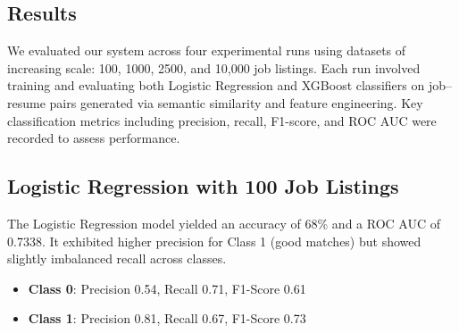 \documentclass[a4paper]{article}
\begin{document}
\begin{multicols}{2}



\section{Results}
We evaluated our system across four experimental runs using datasets of increasing scale: 100, 1000, 2500, and 10,000 job listings. Each run involved training and evaluating both Logistic Regression and XGBoost classifiers on job–resume pairs generated via semantic similarity and feature engineering. Key classification metrics including precision, recall, F1-score, and ROC AUC were recorded to assess performance.

\subsection{Logistic Regression with 100 Job Listings}
The Logistic Regression model yielded an accuracy of 68\% and a ROC AUC of 0.7338. It exhibited higher precision for Class 1 (good matches) but showed slightly imbalanced recall across classes.

\begin{itemize}
    \item \textbf{Class 0}: Precision 0.54, Recall 0.71, F1-Score 0.61
    \item \textbf{Class 1}: Precision 0.81, Recall 0.67, F1-Score 0.73
\end{itemize}


\end{multicols}
\end{document}
